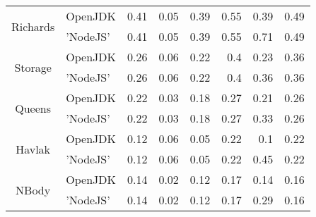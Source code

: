 \begin{center}
\begin{tabular}{ c | l r r r r r r}
\multirow{2}{*}{ Richards } & OpenJDK & 0.41 & 0.05 & 0.39 & 0.55 & 0.39 & 0.49 \\
& 'NodeJS' & 0.41 & 0.05 & 0.39 & 0.55 & 0.71 & 0.49 \\
\midrule

\multirow{2}{*}{ Storage } & OpenJDK & 0.26 & 0.06 & 0.22 & 0.4 & 0.23 & 0.36 \\
& 'NodeJS' & 0.26 & 0.06 & 0.22 & 0.4 & 0.36 & 0.36 \\
\midrule

\multirow{2}{*}{ Queens } & OpenJDK & 0.22 & 0.03 & 0.18 & 0.27 & 0.21 & 0.26 \\
& 'NodeJS' & 0.22 & 0.03 & 0.18 & 0.27 & 0.33 & 0.26 \\
\midrule

\multirow{2}{*}{ Havlak } & OpenJDK & 0.12 & 0.06 & 0.05 & 0.22 & 0.1 & 0.22 \\
& 'NodeJS' & 0.12 & 0.06 & 0.05 & 0.22 & 0.45 & 0.22 \\
\midrule

\multirow{2}{*}{ NBody } & OpenJDK & 0.14 & 0.02 & 0.12 & 0.17 & 0.14 & 0.16 \\
& 'NodeJS' & 0.14 & 0.02 & 0.12 & 0.17 & 0.29 & 0.16 \\
\midrule

\end{tabular}
\end{center}